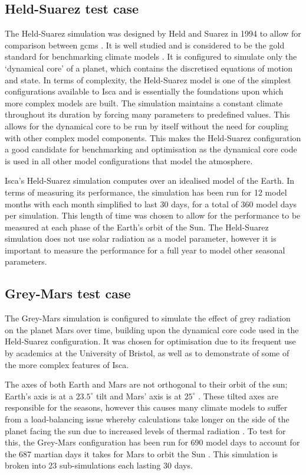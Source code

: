 \documentclass[a4paper,11pt]{report}
\begin{document}
\subsection{Held-Suarez test case}
The Held-Suarez simulation was designed by Held and Suarez in 1994 to allow for comparison between \gls{gcm}s \cite{held1994proposal}. It is well studied and is considered to be the gold standard for benchmarking climate models \cite{wan2008ensemble, duben2014benchmark, taylor1998performance}. It is configured to simulate only the `dynamical core' of a planet, which contains the discretised equations of motion and state. In terms of complexity, the Held-Suarez model is one of the simplest configurations available to Isca and is essentially the foundations upon which more complex models are built. The simulation maintains a constant climate throughout its duration by forcing many parameters to predefined values. This allows for the dynamical core to be run by itself without the need for coupling with other complex model components. This makes the Held-Suarez configuration a good candidate for benchmarking and optimisation as the dynamical core code is used in all other model configurations that model the atmosphere. 
\par
Isca's Held-Suarez simulation computes over an idealised model of the Earth. In terms of measuring its performance, the simulation has been run for 12 model months with each month simplified to last 30 days, for a total of 360 model days per simulation. This length of time was chosen to allow for the performance to be measured at each phase of the Earth's orbit of the Sun. The Held-Suarez simulation does not use solar radiation as a model parameter, however it is important to measure the performance for a full year to model other seasonal parameters.

\subsection{Grey-Mars test case}
\label{sec:grey-mars-conf}
The Grey-Mars simulation is configured to simulate the effect of grey radiation on the planet Mars over time, building upon the dynamical core code used in the Held-Suarez configuration. It was chosen for optimisation due to its frequent use by academics at the University of Bristol, as well as to demonstrate of some of the more complex features of Isca. 
\par
The axes of both Earth and Mars are not orthogonal to their orbit of the sun; Earth's axis is at a $23.5^{\circ}$ tilt and Mars' axis is at $25^{\circ}$ \cite{laskar1993chaotic}.  These tilted axes are responsible for the seasons, however this causes many climate models to suffer from a load-balancing issue whereby calculations take longer on the side of the planet facing the sun due to increased levels of thermal radiation \cite{foster1994load}. To test for this, the Grey-Mars configuration has been run for 690 model days to account for the 687 martian days it takes for Mars to orbit the Sun \cite{meeus1991astronomical}. This simulation is broken into 23 sub-simulations each lasting 30 days. 
\end{document}
